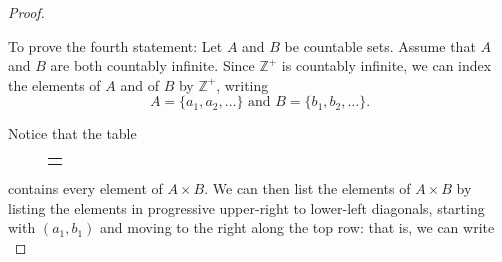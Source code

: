 \documentclass[10pt,]{book}
\theoremstyle{plain}
\theoremstyle{definition}
\theoremstyle{definition}
\theoremstyle{definition}
\theoremstyle{definition}
\numberwithin{equation}{section}
\newlength{\panelmax}
\def\Z{\mathbb{Z}}
\begin{document}
\begin{proof}\hypertarget{proof-4}{}

    To prove the fourth statement: Let \(A\) and \(B\) be countable sets. Assume that \(A\) and \(B\) are both countably infinite. Since \(\Z^+\) is countably infinite, we can index the elements of \(A\) and of \(B\) by \(\Z^+\), writing
\begin{equation*}

      A=\{a_1,a_2,\ldots\} \text{ and }  B=\{b_1,b_2,\ldots\}.
    
\end{equation*}

\par

    Notice that the table
%
{%
\setlength{\panelmax}{0pt}
\newsavebox{\panelboxBtabular}
\newlength{\phBtabular}\setlength{\phBtabular}{\ht\panelboxBtabular+\dp\panelboxBtabular}
\settototalheight{\phBtabular}{\usebox{\panelboxBtabular}}
\setlength{\panelmax}{\maxof{\panelmax}{\phBtabular}}
\leavevmode%
\setlength{\tabcolsep}{0\textwidth}
\begin{figure}
\begin{tabular}{@{}*{1}{c}@{}}
\begin{minipage}[c][\panelmax][t]{1\textwidth}\usebox{\panelboxBtabular}\end{minipage}\end{tabular}
\end{figure}
}%
\par
contains every element of \(A\times B\). We can then list the elements of \(A\times B\) by listing the elements in progressive upper-right to lower-left diagonals, starting with \((a_1,b_1)\) and moving to the right along the top row: that is, we can write
\begin{equation*}


\end{equation*}
\end{proof}
\end{document}
